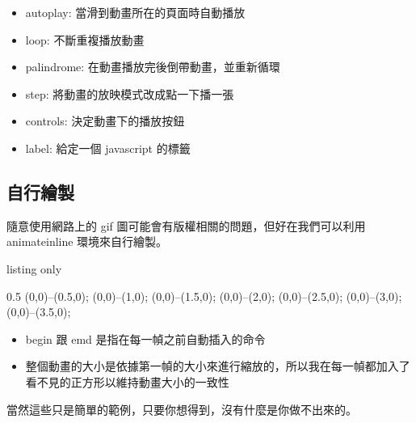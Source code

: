 \begin{itemize}
\item autoplay: 當滑到動畫所在的頁面時自動播放
\item loop: 不斷重複播放動畫
\item palindrome: 在動畫播放完後倒帶動畫，並重新循環
\item step: 將動畫的放映模式改成點一下播一張
\item controls: 決定動畫下的播放按鈕
\item label: 給定一個 javascript 的標籤
\end{itemize}

\subsection{自行繪製}

隨意使用網路上的 gif 圖可能會有版權相關的問題，但好在我們可以利用 animateinline 環境來自行繪製。

\begin{tcblisting}{listing only}
\begin{animateinline}[begin={\begin{tikzpicture}\draw (-1,-1) rectangle (3.5,1);}end={\end{tikzpicture}}]{0.5}
\draw (0,0)--(0.5,0);
\newframe
\draw (0,0)--(1,0);
\newframe
\draw (0,0)--(1.5,0);
\newframe
\draw (0,0)--(2,0);
\newframe
\draw (0,0)--(2.5,0);
\newframe
\draw (0,0)--(3,0);
\newframe
\draw (0,0)--(3.5,0);
\end{animateinline}
\end{tcblisting}

\begin{itemize}
\item begin 跟 emd 是指在每一幀之前自動插入的命令
\item 整個動畫的大小是依據第一幀的大小來進行縮放的，所以我在每一幀都加入了看不見的正方形以維持動畫大小的一致性
\end{itemize}

當然這些只是簡單的範例，只要你想得到，沒有什麼是你做不出來的。
